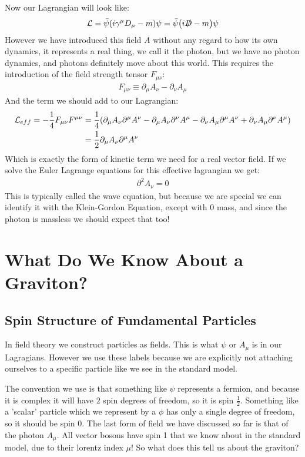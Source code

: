 \documentclass[12pt]{article}
\renewcommand{\L}{\mathcal{L}}
\newcommand{\D}{\partial}
\newcommand{\psib}{\bar{\psi}}
\newcommand{\munu}{{\mu\nu}}
\newcommand{\sla}[1]{\slashed{#1}}
\begin{document}
Now our Lagrangian will look like:
\begin{align*}
  \L=\psib\qty(i\gamma^\mu D_\mu-m)\psi=\psib\qty(i\sla D-m)\psi
\end{align*}
However we have introduced this field $A$ without any regard to how its own dynamics, it represents a real thing, we call it the photon, but we have no photon dynamics, and photons definitely move about this world. This requires the introduction of the field strength tensor $F_\munu$:
\begin{align*}
  F_\munu\equiv\D_\mu A_\nu-\D_\nu A_\mu
\end{align*}
And the term we should add to our Lagrangian:
\begin{align*}
  \L_{eff}=-\frac{1}{4}F_\munu F^\munu&=
  \frac{1}{4}\qty(\D_\mu A_\nu\D^\mu A^\nu-\D_\mu A_\nu\D^\nu A^\mu
  -\D_\nu A_\mu\D^\mu A^\nu+\D_\nu A_\mu\D^\nu A^\mu)\\
  &=\frac{1}{2}\D_\mu A_\nu\D^\mu A^\nu
\end{align*}
Which is exactly the form of kinetic term we need for a real vector field. If we solve the Euler Lagrange equations for this effective lagrangian we get:
\begin{align*}
  \D^2A_\nu=0
\end{align*}
This is typically called the wave equation, but because we are special we can identify it with the Klein-Gordon Equation, except with $0$ mass, and since the photon is massless we should expect that too!
\section{What Do We Know About a Graviton?}
\subsection{Spin Structure of Fundamental Particles}
In field theory we construct particles as fields. This is what $\psi$ or $A_\mu$ is in our Lagragians. However we use these labels because we are explicitly not attaching ourselves to a specific particle like we see in the standard model.

The convention we use is that something like $\psi$ represents a fermion, and because it is complex it will have $2$ spin degrees of freedom, so it is spin $\frac{1}{2}$. Something like a 'scalar' particle which we represent by a $\phi$ has only a single degree of freedom, so it should be spin $0$. The last form of field we have discussed so far is that of the photon $A_\mu$. All vector bosons have spin 1 that we know about in the standard model, due to their lorentz index $\mu$! So what does this tell us about the graviton?
\end{document}

